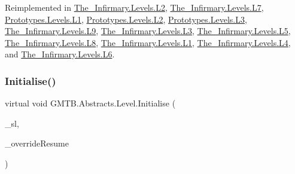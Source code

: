 Reimplemented in \mbox{\hyperlink{class_the___infirmary_1_1_levels_1_1_l2_adc921dbddf3cfb4274bbebb61d551c41}{The\+\_\+\+Infirmary.\+Levels.\+L2}}, \mbox{\hyperlink{class_the___infirmary_1_1_levels_1_1_l7_a349906e4400cff8ec3688537c7a40f88}{The\+\_\+\+Infirmary.\+Levels.\+L7}}, \mbox{\hyperlink{class_prototypes_1_1_levels_1_1_l1_acdc4fddb5e25296cce22e0c275b32de7}{Prototypes.\+Levels.\+L1}}, \mbox{\hyperlink{class_prototypes_1_1_levels_1_1_l2_a44a8b18b374ec89d0970e13b5da57806}{Prototypes.\+Levels.\+L2}}, \mbox{\hyperlink{class_prototypes_1_1_levels_1_1_l3_a3bc54461ba03ddd3157220c42bdc6d54}{Prototypes.\+Levels.\+L3}}, \mbox{\hyperlink{class_the___infirmary_1_1_levels_1_1_l9_a4c00f07d3adeb5fc814f9692efd5adc6}{The\+\_\+\+Infirmary.\+Levels.\+L9}}, \mbox{\hyperlink{class_the___infirmary_1_1_levels_1_1_l3_aa3f7e6218dcc9888160f80dfc48af443}{The\+\_\+\+Infirmary.\+Levels.\+L3}}, \mbox{\hyperlink{class_the___infirmary_1_1_levels_1_1_l5_ae27f4406b6d74c7634d3f42a26526650}{The\+\_\+\+Infirmary.\+Levels.\+L5}}, \mbox{\hyperlink{class_the___infirmary_1_1_levels_1_1_l8_af246318b7f74c9491887facd3d6face0}{The\+\_\+\+Infirmary.\+Levels.\+L8}}, \mbox{\hyperlink{class_the___infirmary_1_1_levels_1_1_l1_a323ed6642d397f9f04608ff0cf42bfd3}{The\+\_\+\+Infirmary.\+Levels.\+L1}}, \mbox{\hyperlink{class_the___infirmary_1_1_levels_1_1_l4_a50a15955ce03ea614a3fcc32df4672de}{The\+\_\+\+Infirmary.\+Levels.\+L4}}, and \mbox{\hyperlink{class_the___infirmary_1_1_levels_1_1_l6_a430f45237d92f3cae4db4e3399c30029}{The\+\_\+\+Infirmary.\+Levels.\+L6}}.

\mbox{\label{class_g_m_t_b_1_1_abstracts_1_1_level_a68659ce713c8bd1ca17cebb001f0fd65}} 
\subsubsection{\texorpdfstring{Initialise()}{Initialise()}\hspace{0.1cm}{\footnotesize\ttfamily [2/2]}}
{\footnotesize\ttfamily virtual void G\+M\+T\+B.\+Abstracts.\+Level.\+Initialise (\begin{DoxyParamCaption}\item[{\mbox{\hyperlink{interface_g_m_t_b_1_1_interfaces_1_1_i_service_locator}{I\+Service\+Locator}}}]{\+\_\+sl,  }\item[{bool}]{\+\_\+override\+Resume }\end{DoxyParamCaption})\hspace{0.3cm}{\ttfamily [virtual]}}



